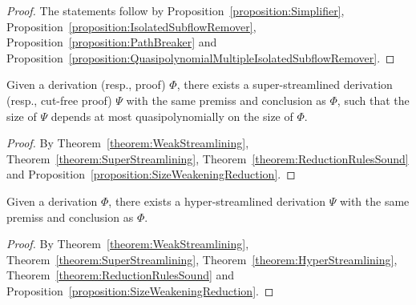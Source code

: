 \begin{proof}
The statements follow by Proposition~\vref{proposition:Simplifier}, Proposition~\vref{proposition:IsolatedSubflowRemover}, Proposition~\vref{proposition:PathBreaker} and Proposition~\vref{proposition:QuasipolynomialMultipleIsolatedSubflowRemover}.
\end{proof}

\begin{corollary}\label{corollary:SuperStreamlining}
Given a derivation (resp., proof)\/ $\Phi$, there exists a super-streamlined derivation (resp., cut-free proof)\/ $\Psi$ with the same premiss and conclusion as\/ $\Phi$, such that the size of\/ $\Psi$ depends at most quasipolynomially on the size of\/ $\Phi$.
\end{corollary}

\begin{proof}
By Theorem~\ref{theorem:WeakStreamlining}, Theorem~\vref{theorem:SuperStreamlining}, Theorem~\vref{theorem:ReductionRulesSound} and Proposition~\vref{proposition:SizeWeakeningReduction}.
\end{proof}

\begin{corollary}\label{corollary:HyperStreamlining}
Given a derivation\/ $\Phi$, there exists a hyper-streamlined derivation\/ $\Psi$ with the same premiss and conclusion as\/ $\Phi$.
\end{corollary}

\begin{proof}
By Theorem~\ref{theorem:WeakStreamlining}, Theorem~\vref{theorem:SuperStreamlining}, Theorem~\vref{theorem:HyperStreamlining}, Theorem~\vref{theorem:ReductionRulesSound} and Proposition~\vref{proposition:SizeWeakeningReduction}.
\end{proof}
